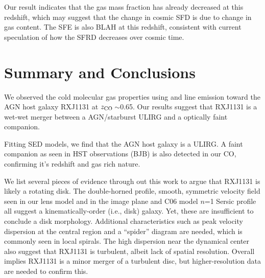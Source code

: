 \documentclass[]{emulateapj}
\begin{document}

Our result indicates that the gas mass fraction has already decreased
at this redshift, which may suggest that the change in cosmic SFD is due to
change in gas content. The SFE is also BLAH at this redshift,
consistent with current speculation of how the SFRD decreases over cosmic time.

\section{Summary and Conclusions}


We observed the cold molecular gas properties using \bco and \cco line emission
toward the AGN host galaxy RXJ1131 at $z_{\rm CO}$\,$\sim$0.65.
Our results suggest that RXJ1131 is a wet-wet merger between a AGN/starburst
ULIRG and a optically faint companion.

Fitting SED models, we find that the AGN host galaxy is a ULIRG.
A faint companion as seen in HST observations (BJB) is also detected in our CO, confirming it's redshift and gas rich nature.

We list several pieces of evidence through out
this work to argue that RXJ1131 is likely a rotating disk.
The double-horned profile, smooth, symmetric velocity field
seen in our lens model and in the
image plane and C06 model $n$=1 Sersic profile all suggest
a kinematically-order (i.e., disk) galaxy.
Yet, these are insufficient to conclude a disk morphology. Additional
characteristics such as peak velocity dispersion at the central region and a
``spider'' diagram are needed, which is commonly seen in local spirals.
The high dispersion near the dynamical center also
suggest that RXJ1131 is turbulent, albeit lack of spatial resolution. Overall
implies RXJ1131 is a minor merger of a turbulent disc, but higher-resolution
data are needed to confirm this.



\acknowledgments




\end{document}

